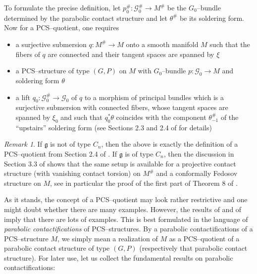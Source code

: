 \documentclass[12pt,a4paper]{amsart}
\def\frak{\mathfrak}
\def\Cal{\mathcal}
\renewcommand{\th}{\theta}
\newcounter{theorem}
\numberwithin{theorem}{section}
\theoremstyle{definition}
\theoremstyle{remark}
\newtheorem{remark}[theorem]{Remark}
\begin{document}
To formulate the precise definition, let $p_0^\#:\Cal G_0^\#\to M^\#$
be the $G_0$--bundle determined by the parabolic contact structure and
let $\th^\#$ be its soldering form. Now for a PCS--quotient, one
requires 
\begin{itemize}
\item a surjective submersion $q:M^\#\to M$ onto a smooth manifold $M$
  such that the fibers of $q$ are connected and their tangent spaces
  are spanned by $\xi$
\item a PCS--structure of type $(G,P)$ on $M$ with $G_0$--bundle
  $p:\Cal G_0\to M$ and soldering form $\th$
\item a lift $q_0:\Cal G_0^\#\to\Cal G_0$ of $q$ to a morphism of
  principal bundles which is a surjective submersion with connected
  fibers, whose tangent spaces are spanned by $\xi_0$ and such that
  $q_0^*\th$ coincides with the component $\th^\#_{-1}$ of the
  ``upstairs'' soldering form (see Sections 2.3 and 2.4 of \cite{PCS2}
  for details)
\end{itemize}

\begin{remark}\label{rem2.3}
If $\frak g$ is not of type $C_n$, then the above is exactly the
definition of a PCS--quotient from Section 2.4 of \cite{PCS2}. If
$\frak g$ is of type $C_n$, then the discussion in Section 3.3 of
\cite{PCS2} shows that the same setup is available for a projective
contact structure (with vanishing contact torsion) on $M^\#$ and a
conformally Fedosov structure on $M$, see in particular the proof of
the first part of Theorem 8 of \cite{PCS2}.
\end{remark}

As it stands, the concept of a PCS--quotient may look rather
restrictive and one might doubt whether there are many
examples. However, the results of \cite{Cap-Salac} and of \cite{PCS2}
imply that there are lots of examples. This is best formulated in the
language of \textit{parabolic contactifications} of
PCS--structures. By a parabolic contactifications of a PCS--structure
$M$, we simply mean a realization of $M$ as a PCS--quotient of a
parabolic contact structure of type $(G,P)$ (respectively that
parabolic contact structure). For later use, let us collect the
fundamental results on parabolic contactifications:
\end{document}
